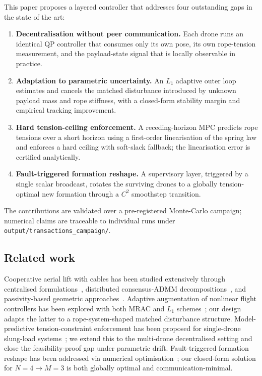 \documentclass[journal,twocolumn,10pt]{IEEEtran}
\begin{document}
This paper proposes a layered controller that addresses four
outstanding gaps in the state of the art:

\begin{enumerate}
\item \textbf{Decentralisation without peer communication.} Each
      drone runs an identical QP controller that consumes only its
      own pose, its own rope-tension measurement, and the
      payload-state signal that is locally observable in practice.
\item \textbf{Adaptation to parametric uncertainty.} An $L_1$
      adaptive outer loop estimates and cancels the matched
      disturbance introduced by unknown payload mass and rope
      stiffness, with a closed-form stability margin and empirical
      tracking improvement.
\item \textbf{Hard tension-ceiling enforcement.} A receding-horizon
      MPC predicts rope tensions over a short horizon using a
      first-order linearisation of the spring law and enforces a
      hard ceiling with soft-slack fallback; the linearisation error
      is certified analytically.
\item \textbf{Fault-triggered formation reshape.} A supervisory
      layer, triggered by a single scalar broadcast, rotates the
      surviving drones to a globally tension-optimal new formation
      through a $C^2$ smoothstep transition.
\end{enumerate}

The contributions are validated over a pre-registered Monte-Carlo
campaign; numerical claims are traceable to individual runs under
\texttt{output/transactions\_campaign/}.

\subsection{Related work}
\label{sec:related}

Cooperative aerial lift with cables has been studied extensively
through centralised formulations~\cite{Michael2011}, distributed
consensus-ADMM decompositions~\cite{WangOng2017}, and
passivity-based geometric
approaches~\cite{Lee2018,SreenathKumar2013}. Adaptive augmentation
of nonlinear flight controllers has been explored with both MRAC
and $L_1$ schemes~\cite{CaoHovakimyan}; our design adapts the
latter to a rope-system-shaped matched disturbance structure.
Model-predictive tension-constraint enforcement has been proposed
for single-drone slung-load
systems~\cite{Potter2021,BisgaardRazi2007}; we extend this to the
multi-drone decentralised setting and close the feasibility-proof
gap under parametric drift. Fault-triggered formation reshape has
been addressed via numerical optimisation~\cite{MichieliSecchi2019};
our closed-form solution for $N=4\to M=3$ is both globally optimal
and communication-minimal.
\end{document}
